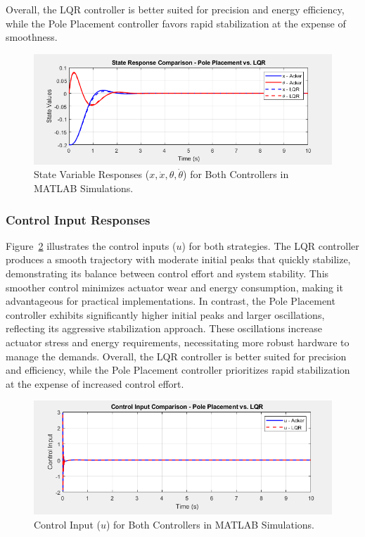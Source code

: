 \documentclass[conference]{IEEEtran}
\begin{document}
Overall, the LQR controller is better suited for precision and energy efficiency, while the Pole Placement controller favors rapid stabilization at the expense of smoothness.

\begin{figure}[H]
    \centering
    \includegraphics[width=0.8\linewidth]{figures/state_sim.png}
    \caption{State Variable Responses (\(x, \dot{x}, \theta, \dot{\theta}\)) for Both Controllers in MATLAB Simulations.}
    \label{fig:state_sim}
\end{figure}

\subsubsection{Control Input Responses}
Figure~\ref{fig:control_input_sim} illustrates the control inputs (\(u\)) for both strategies. The LQR controller produces a smooth trajectory with moderate initial peaks that quickly stabilize, demonstrating its balance between control effort and system stability. This smoother control minimizes actuator wear and energy consumption, making it advantageous for practical implementations. In contrast, the Pole Placement controller exhibits significantly higher initial peaks and larger oscillations, reflecting its aggressive stabilization approach. These oscillations increase actuator stress and energy requirements, necessitating more robust hardware to manage the demands. Overall, the LQR controller is better suited for precision and efficiency, while the Pole Placement controller prioritizes rapid stabilization at the expense of increased control effort.


\begin{figure}[H]
    \centering
    \includegraphics[width=0.8\linewidth]{figures/control_input_sim.png}
    \caption{Control Input (\(u\)) for Both Controllers in MATLAB Simulations.}
    \label{fig:control_input_sim}
\end{figure}
\end{document}
